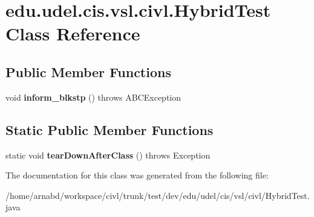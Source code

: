 \hypertarget{classedu_1_1udel_1_1cis_1_1vsl_1_1civl_1_1HybridTest}{}\section{edu.\+udel.\+cis.\+vsl.\+civl.\+Hybrid\+Test Class Reference}
\label{classedu_1_1udel_1_1cis_1_1vsl_1_1civl_1_1HybridTest}
\subsection*{Public Member Functions}
\begin{DoxyCompactItemize}
\item 
\hypertarget{classedu_1_1udel_1_1cis_1_1vsl_1_1civl_1_1HybridTest_a5dbf35b41be2c270db3a25ddd0f97518}{}void {\bfseries inform\+\_\+blkstp} ()  throws A\+B\+C\+Exception \label{classedu_1_1udel_1_1cis_1_1vsl_1_1civl_1_1HybridTest_a5dbf35b41be2c270db3a25ddd0f97518}

\end{DoxyCompactItemize}
\subsection*{Static Public Member Functions}
\begin{DoxyCompactItemize}
\item 
\hypertarget{classedu_1_1udel_1_1cis_1_1vsl_1_1civl_1_1HybridTest_af9ce5ac7cc47601976cd7fb8c9f018a0}{}static void {\bfseries tear\+Down\+After\+Class} ()  throws Exception \label{classedu_1_1udel_1_1cis_1_1vsl_1_1civl_1_1HybridTest_af9ce5ac7cc47601976cd7fb8c9f018a0}

\end{DoxyCompactItemize}


The documentation for this class was generated from the following file\+:\begin{DoxyCompactItemize}
\item 
/home/arnabd/workspace/civl/trunk/test/dev/edu/udel/cis/vsl/civl/Hybrid\+Test.\+java\end{DoxyCompactItemize}

